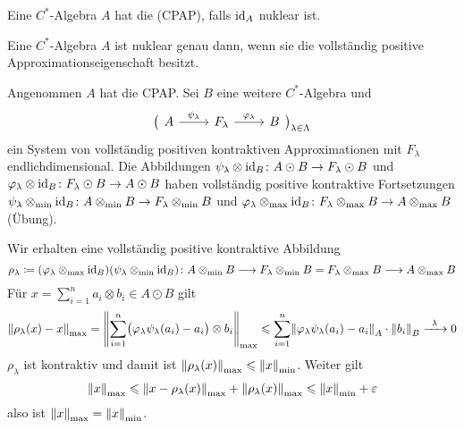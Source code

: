 \begin{definition}[{name=[{vollständig positive Approximationseigenschaft}]}]
	Eine $C^*$-Algebra $A$ hat die  (CPAP), falls $\id_A$ nuklear ist.
\end{definition}

\begin{satz}[{name={Choi-Effros; Kirchberg}}]
	Eine $C^*$-Algebra $A$ ist nuklear genau dann, wenn sie die vollständig positive Approximationseigenschaft besitzt.
\end{satz}
\begin{beweis}
	Angenommen $A$ hat die CPAP.
	Sei $B$ eine weitere $C^*$-Algebra und 
	\[
		\big(\begin{tikzcd}
			A \rar["\psi_\lambda"] & F_\lambda \rar["\varphi_\lambda"] & B
		\end{tikzcd}\big)_{\lambda \in \Lambda}
	\]
	ein System von vollständig positiven kontraktiven Approximationen mit $F_\lambda$ endlichdimensional.
	Die Abbildungen $\psi_\lambda \otimes {\id_B} \colon A \odot B \to F_\lambda \odot B$ und $\varphi_\lambda \otimes {\id_B} \colon F_\lambda \odot B \to A \odot B$ haben vollständig positive kontraktive Fortsetzungen $\psi_\lambda \tensormin {\id_B} \colon A \tensormin B \to F_\lambda \tensormin B$ und $\varphi_\lambda \tensormax  {\id_B} \colon F_\lambda \tensormax B \to A \tensormax B$ (Übung).
	
	Wir erhalten eine vollständig positive kontraktive Abbildung
	\[
		\rho_\lambda \coloneqq \enbrace*{\varphi_\lambda \tensormax {\id_B}} \enbrace*{\psi_\lambda \tensormin {\id_B}} \colon A \tensormin B \longrightarrow F_\lambda \tensormin B = F_\lambda \tensormax B \longrightarrow A \tensormax B
	\]
	Für $x = \sum_{i=1}^{n} a_i \otimes b_i \in  A \odot B$ gilt
	\[
		\norm*{\rho_\lambda(x) -x}_{\max} = \norm*{\sum_{i=1}^{n} \enbrace[\big]{\varphi_\lambda \psi_\lambda(a_i) - a_i} \otimes b_i}_{\max} \le \sum_{i=1}^{n} \norm*{\varphi_\lambda \psi_\lambda(a_i) - a_i}_A \cdot \norm*{b_i}_B \grenzw{\lambda} 0 
	\]
	$\rho_\lambda$ ist kontraktiv und damit ist $\norm*{\rho_\lambda(x)}_{\max} \le \norm*{x}_{\min}$. 
	Weiter gilt
	\[
		\norm*{x}_{\max} \le \norm*{x - \rho_\lambda(x)}_{\max} + \norm*{\rho_\lambda(x)}_{\max} \le \norm*{x}_{\min} + \varepsilon
	\]
	also ist $\norm*{x}_{\max} = \norm*{x}_{\min}$.
	

\end{beweis}
